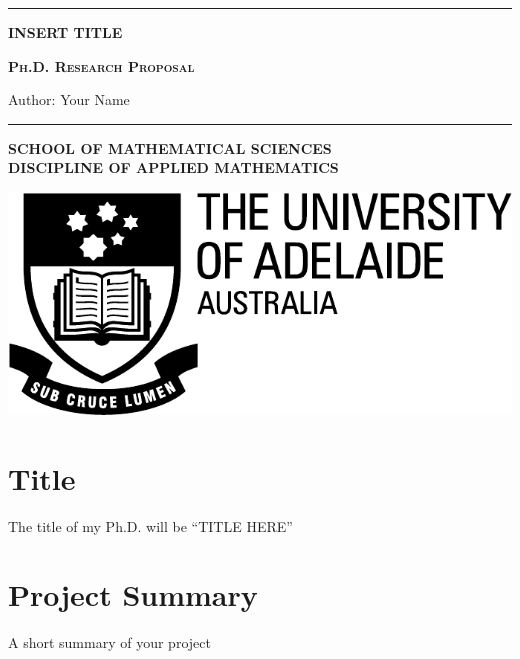 \documentclass[a4paper]{article}
\theoremstyle{remark}
\begin{document}
\begin{titlepage}
\begin{flushleft} 
\hrule
\vspace{1 cm}
{\huge{\bf{INSERT TITLE}}}

\textsc{\bf{Ph.D. Research Proposal}}

\vspace*{2cm}\vspace{2 cm}
{\large Author: Your Name}

\vspace{3.5 cm}{\large Principal Supervisor: Put a name here}

\vspace{0.3 cm}{\large Secondary Supervisor: And here}

\vspace{2.5 cm}{\today}


\vspace{3 cm} \hrule
\end{flushleft}

\begin{flushleft}\textbf{\textsf{SCHOOL OF MATHEMATICAL SCIENCES\\ DISCIPLINE OF APPLIED MATHEMATICS}}\end{flushleft} \vspace{-1.5cm}
\begin{flushright} \includegraphics[scale=0.3]{ua_crest.pdf}\end{flushright}\vspace{-2 cm}
\end{titlepage}

\tableofcontents
\newpage

\section{Title}
The title of my Ph.D. will be ``TITLE HERE''

\section{Project Summary}
A short summary of your project
\end{document}
